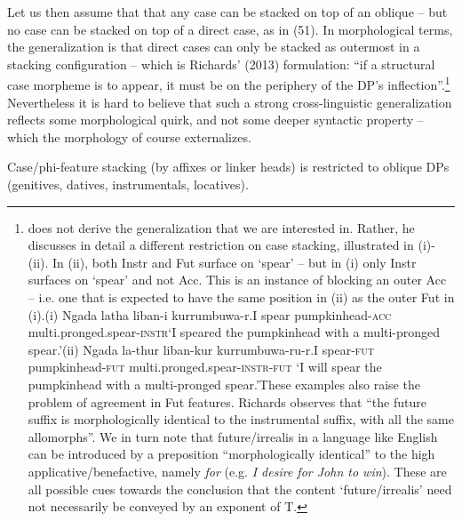 \documentclass[output=paper]{langsci/langscibook}
\begin{document}
Let us then assume that that any case can be stacked on top of an oblique – but no case can be stacked on top of a direct case, as in (51). In morphological terms, the generalization is that direct cases can only be stacked as outermost in a stacking configuration – which is Richards’ (2013) formulation: “if a structural case morpheme is to appear, it must be on the periphery of the DP’s inflection”.\footnote{\citet{Richards2013} does not derive the generalization that we are interested in. Rather, he discusses in detail a different restriction on case stacking, illustrated in (i)-(ii). In (ii), both Instr and Fut surface on ‘spear’ – but in (i) only Instr surfaces on ‘spear’ and not Acc. This is an instance of blocking an outer Acc – i.e. one that is expected to have the same position in (ii) as the outer Fut in (i).(i)   Ngada latha   liban-i       kurrumbuwa-r.I   spear   pumpkinhead-\textsc{acc}   multi.pronged.spear-\textsc{instr}‘I speared the pumpkinhead with a multi-pronged spear.’(ii)  Ngada     la-thur     liban-kur     kurrumbuwa-ru-r.I     spear-\textsc{fut}   pumpkinhead-\textsc{fut}   multi.pronged.spear-\textsc{instr-fut} ‘I will spear the pumpkinhead with a multi-pronged spear.’These examples also raise the problem of agreement in Fut features. Richards observes that “the future suffix is morphologically identical to the instrumental suffix, with all the same allomorphs”. We in turn note that future/irrealis in a language like English can be introduced by a preposition “morphologically identical” to the high applicative/benefactive, namely \textit{for} (e.g. \textit{I desire for John to win}). These are all possible cues towards the conclusion that the content ‘future/irrealis’ need not necessarily be conveyed by an exponent of T.}  Nevertheless it is hard to believe that such a strong cross-linguistic generalization reflects some morphological quirk, and not some deeper syntactic property – which the morphology of course externalizes. 

\ea%
    \label{ex:manzini:51}
    Case/phi-feature stacking (by affixes or linker heads) is restricted to oblique DPs (genitives, datives, instrumentals, locatives).  
    \z         
\end{document}
